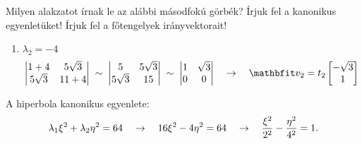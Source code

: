 \begin{exercise}{%
    Milyen alakzatot írnak le az alábbi másodfokú görbék?
    Írjuk fel a kanonikus egyenletüket!
    Írjuk fel a főtengelyek irányvektorait!
  }
{\begin{enumerate}[a)]
\begin{enumerate}[1)]
\[                      \begin{vmatrix}
                        1 - 16     & 5 \sqrt{3} \\
                        5 \sqrt{3} & 11 - 16
                      \end{vmatrix} \;\sim\; \begin{vmatrix}
                        -15        & 5 \sqrt{3} \\
                        5 \sqrt{3} & -5
                      \end{vmatrix} \;\sim\; \begin{vmatrix}
                        -\sqrt{3} & 1 \\
                        0         & 0
                      \end{vmatrix}
                      \quad \rightarrow \quad
                      \rvec v_1 = t_1 \begin{bmatrix}
                        1 \\ \sqrt{3}
                      \end{bmatrix}
                    \]
              \item $\lambda_2 = -4$
                    \[
                      \begin{vmatrix}
                        1 + 4      & 5 \sqrt{3} \\
                        5 \sqrt{3} & 11 + 4
                      \end{vmatrix} \;\sim\; \begin{vmatrix}
                        5          & 5 \sqrt{3} \\
                        5 \sqrt{3} & 15
                      \end{vmatrix} \;\sim\; \begin{vmatrix}
                        1 & \sqrt{3} \\
                        0 & 0
                      \end{vmatrix}
                      \quad \rightarrow \quad
                      \rvec v_2 = t_2 \begin{bmatrix}
                        -\sqrt{3} \\ 1
                      \end{bmatrix}
                    \]
            \end{enumerate}

            A hiperbola kanonikus egyenlete:
            \[
              \lambda_1 \xi^2 + \lambda_2 \eta^2 = 64
              \quad \rightarrow \quad
              16 \xi^2 - 4 \eta^2 = 64
              \quad \rightarrow \quad
              \frac{\xi^2}{2^2} - \frac{\eta^2}{4^2} = 1
              \text.
            \]


\end{enumerate}}
\end{exercise}
